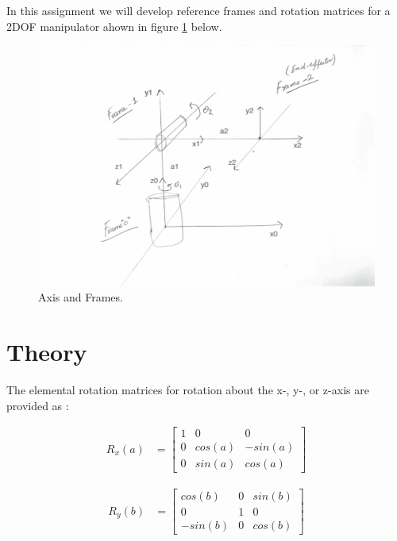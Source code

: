 \documentclass[a4paper, titlepage]{article}
\begin{document}
In this assignment we will develop reference frames and rotation matrices for a 2DOF manipulator ahown in figure \ref{fig:axisframes} below.

 
\begin{figure}[h!]
\center
\includegraphics[scale=0.5]{../figures/axisframes.png}
\caption{Axis and Frames.}
\label{fig:axisframes}
\end{figure} 
   

\section{Theory}

The elemental rotation matrices for rotation about the x-, y-, or z-axis are provided as \citep[p.16]{ho90}: 

\begin{equation}
\begin{split}
R_{x}(a)
&=
\begin{bmatrix}
1 & 0 & 0 \\ 0 & cos(a) & -sin(a) \\ 0 & sin(a) & cos(a)
\end{bmatrix}
\end{split}
\end{equation}

\begin{equation}
\begin{split}
R_{y}(b)
&=
\begin{bmatrix}
cos(b) & 0 & sin(b) \\ 0 & 1 & 0 \\ -sin(b) & 0 & cos(b)
\end{bmatrix}
\end{split}
\end{equation}
\end{document}

